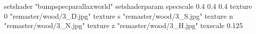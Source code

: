 setshader "bumpspecparallaxworld"
setshaderparam specscale 0.4 0.4 0.4
    texture 0 "remaster/wood/3_D.jpg"
    texture s "remaster/wood/3_S.jpg"
    texture n "remaster/wood/3_N.jpg"
    texture z "remaster/wood/3_H.jpg"
    texscale 0.125